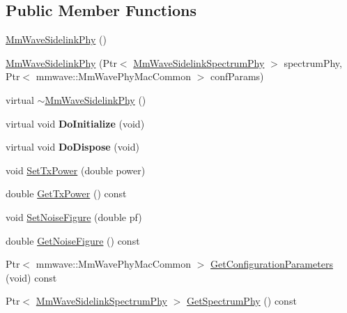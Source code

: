 \subsection*{Public Member Functions}
\begin{DoxyCompactItemize}
\item 
\hyperlink{classns3_1_1millicar_1_1MmWaveSidelinkPhy_a6e37d7c3454a97b25e058a0bc4dd7bb6}{Mm\+Wave\+Sidelink\+Phy} ()
\item 
\hyperlink{classns3_1_1millicar_1_1MmWaveSidelinkPhy_ad8eab5190cd17e75f8d3e8711f16b76e}{Mm\+Wave\+Sidelink\+Phy} (Ptr$<$ \hyperlink{classns3_1_1millicar_1_1MmWaveSidelinkSpectrumPhy}{Mm\+Wave\+Sidelink\+Spectrum\+Phy} $>$ spectrum\+Phy, Ptr$<$ mmwave\+::\+Mm\+Wave\+Phy\+Mac\+Common $>$ conf\+Params)
\item 
virtual \hyperlink{classns3_1_1millicar_1_1MmWaveSidelinkPhy_ab0a97172cbc36ed6d0357761ca06af92}{$\sim$\+Mm\+Wave\+Sidelink\+Phy} ()
\item 
\mbox{\label{classns3_1_1millicar_1_1MmWaveSidelinkPhy_a892c42e5b40f18979e0ebd01953bae7a}} 
virtual void {\bfseries Do\+Initialize} (void)
\item 
\mbox{\label{classns3_1_1millicar_1_1MmWaveSidelinkPhy_a0a4c5d35850f4ee0d23a626f41652441}} 
virtual void {\bfseries Do\+Dispose} (void)
\item 
void \hyperlink{classns3_1_1millicar_1_1MmWaveSidelinkPhy_a58cf1b6bffacbf29abec6feb0cb35253}{Set\+Tx\+Power} (double power)
\item 
double \hyperlink{classns3_1_1millicar_1_1MmWaveSidelinkPhy_ae1c99f95c48cbdaf4066f1a4310ffff2}{Get\+Tx\+Power} () const
\item 
void \hyperlink{classns3_1_1millicar_1_1MmWaveSidelinkPhy_a3003041c8b2124b9c527b0bfe516c9ee}{Set\+Noise\+Figure} (double pf)
\item 
double \hyperlink{classns3_1_1millicar_1_1MmWaveSidelinkPhy_adcc119b8134bc2ee18088a0ef7c298e3}{Get\+Noise\+Figure} () const
\item 
Ptr$<$ mmwave\+::\+Mm\+Wave\+Phy\+Mac\+Common $>$ \hyperlink{classns3_1_1millicar_1_1MmWaveSidelinkPhy_aa774d38f7f3597cf79b2d55f16a1d2ba}{Get\+Configuration\+Parameters} (void) const
\item 
Ptr$<$ \hyperlink{classns3_1_1millicar_1_1MmWaveSidelinkSpectrumPhy}{Mm\+Wave\+Sidelink\+Spectrum\+Phy} $>$ \hyperlink{classns3_1_1millicar_1_1MmWaveSidelinkPhy_ad351ad92c46d2250c1848cc6f45d3de9}{Get\+Spectrum\+Phy} () const

\end{DoxyCompactItemize}
